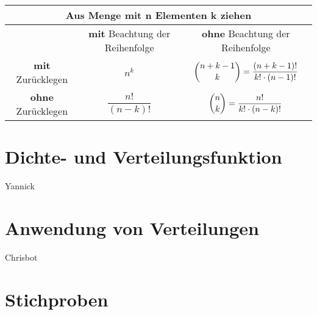 \documentclass[11pt, a4paper]{article}
\begin{document}
\vspace{\baselineskip}
\begin{tabular}{|c||c|c|}
	\hline
	\multicolumn{3}{|c|}{Aus Menge mit \textbf{n} Elementen \textbf{k} ziehen} \\
	\hline
	 & \textbf{mit} Beachtung der Reihenfolge & \textbf{ohne} Beachtung der Reihenfolge \\
	\hline \hline
	\textbf{mit} Zurücklegen & $n^k$ & $\dbinom{n+k-1}{k} = \dfrac{(n+k-1)!}{k!\cdot (n-1)!}$ \\
	\hline
	\textbf{ohne} Zurücklegen & $\dfrac{n!}{(n-k)!}$ & $\dbinom{n}{k} = \dfrac{n!}{k!\cdot (n-k)!}$ \\
\hline
\end{tabular}


\newpage
\section{Dichte- und Verteilungsfunktion}
Yannick

\newpage
\section{Anwendung von Verteilungen}
Chrisbot

\newpage
\section{Stichproben}
\end{document}
